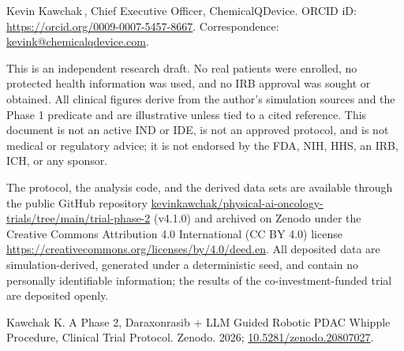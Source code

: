 Kevin Kawchak\,, Chief Executive Officer,
ChemicalQDevice. ORCID iD: \href{https://orcid.org/0009-0007-5457-8667}{https://orcid.org/0009-0007-5457-8667}.
Correspondence: \href{mailto:kevink@chemicalqdevice.com}{kevink@chemicalqdevice.com}.

This is an independent research draft. No real patients were enrolled, no protected
health information was used, and no IRB approval was sought or obtained. All clinical
figures derive from the author's simulation sources and the Phase 1 predicate and
are illustrative unless tied to a cited reference. This document is not an active IND
or IDE, is not an approved protocol, and is not medical or regulatory advice; it is
not endorsed by the FDA, NIH, HHS, an IRB, ICH, or any sponsor.

The protocol, the analysis code, and the derived data sets are available through the
public GitHub repository \href{https://github.com/kevinkawchak/physical-ai-oncology-trials/tree/main/trial-phase-2}{kevinkawchak/physical-ai-oncology-trials/tree/main/trial-phase-2} (v4.1.0) and archived on Zenodo under the Creative Commons
Attribution 4.0 International (CC BY 4.0) license \href{https://creativecommons.org/licenses/by/4.0/deed.en}{https://creativecommons.org/licenses/by/4.0/deed.en}. All deposited data are simulation-derived,
generated under a deterministic seed, and contain no personally identifiable
information; the results of the co-investment-funded trial are deposited openly.

Kawchak K. A Phase 2, Daraxonrasib + LLM Guided Robotic PDAC Whipple Procedure, Clinical Trial Protocol. Zenodo.
2026; \href{https://doi.org/10.5281/zenodo.20807027}{10.5281/zenodo.20807027}.

\begingroup\raggedright\nocite{*}\endgroup
